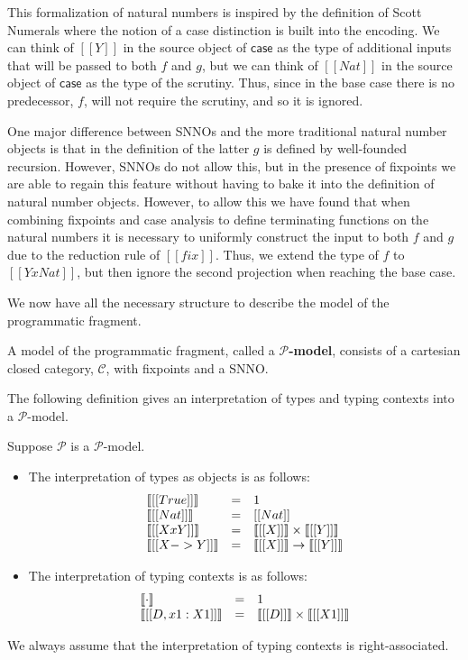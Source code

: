 \documentclass{article}
\let\to\rightarrow
\newcommand{\cat}[1]{\mathcal{#1}}
\newcommand{\case}[0]{\mathsf{case}}
\begin{document}
\noindent This formalization of natural numbers is inspired by the
definition of Scott Numerals \cite{??} where the notion of a case
distinction is built into the encoding. We can think of $[[Y]]$ in the
source object of $\case$ as the type of additional inputs that will be
passed to both $f$ and $g$, but we can think of $[[Nat]]$ in the
source object of $\case$ as the type of the scrutiny.  Thus, since in
the base case there is no predecessor, $f$, will not require the
scrutiny, and so it is ignored.

One major difference between SNNOs and the more traditional natural
number objects is that in the definition of the latter $g$ is defined
by well-founded recursion.  However, SNNOs do not allow this, but in
the presence of fixpoints we are able to regain this feature without
having to bake it into the definition of natural number objects.
However, to allow this we have found that when combining fixpoints and
case analysis to define terminating functions on the natural numbers
it is necessary to uniformly construct the input to both $f$ and $g$
due to the reduction rule of $[[fix]]$.  Thus, we extend the type of
$f$ to $[[Y x Nat]]$, but then ignore the second projection when
reaching the base case.

We now have all the necessary structure to describe the model of the
programmatic fragment.
\begin{definition}
  \label{def:P-model}
  A model of the programmatic fragment, called a
  \textbf{$\cat{P}$-model}, consists of a cartesian closed category,
  $\cat{C}$, with fixpoints and a SNNO.
\end{definition}
\noindent
The following definition gives an interpretation of types and typing
contexts into a $\cat{P}$-model.
\begin{definition}
  \label{def:term-interp}
  Suppose $\cat{P}$ is a $\cat{P}$-model.
  \begin{itemize}
  \item The interpretation of types as objects is as follows:
    \[
    \begin{array}{lll}
      \interp{[[True]]} & = & 1\\
      \interp{[[Nat]]} & = & [[Nat]]\\
      \interp{[[X x Y]]} & = & \interp{[[X]]} \times \interp{[[Y]]}\\
      \interp{[[X -> Y]]} & = & \interp{[[X]]} \to \interp{[[Y]]}\\      
    \end{array}
    \]

  \item The interpretation of typing contexts is as follows:
    \[
    \begin{array}{lll}
      \llbracket \cdot \rrbracket & = & 1\\
      \llbracket [[D,x1 : X1]] \rrbracket & = &
      \llbracket [[D]] \rrbracket \times \llbracket [[X1]] \rrbracket\\
    \end{array}
    \]
  \end{itemize}
  We always assume that the interpretation of typing contexts is
  right-associated.  
\end{definition}
\end{document}
